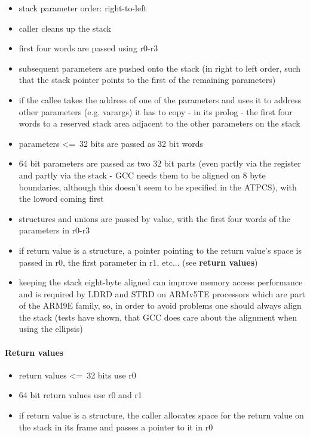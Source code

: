 \begin{itemize}
\item stack parameter order: right-to-left
\item caller cleans up the stack
\item first four words are passed using r0-r3
\item subsequent parameters are pushed onto the stack (in right to left order, such that the stack pointer points to the first of the remaining parameters)
\item if the callee takes the address of one of the parameters and uses it to address other parameters (e.g. varargs) it has to copy - in its prolog - the first four words to a reserved stack area adjacent to the other parameters on the stack
\item parameters \textless=\ 32 bits are passed as 32 bit words
\item 64 bit parameters are passed as two 32 bit parts (even partly via the register and partly via the stack - GCC needs them to be aligned on 8 byte boundaries, although this doesn't seem to be specified in the ATPCS), with the loword coming first
\item structures and unions are passed by value, with the first four words of the parameters in r0-r3
\item if return value is a structure, a pointer pointing to the return value's space is passed in r0, the first parameter in r1, etc... (see {\bf return values})
\item keeping the stack eight-byte aligned can improve memory access performance and is required by LDRD and STRD on ARMv5TE processors which are part of the ARM9E family, so, in order to avoid problems one should always align the stack (tests have shown, that GCC does care about the alignment when using the ellipsis)
\end{itemize}


\paragraph{Return values}
\begin{itemize}
\item return values \textless=\ 32 bits use r0
\item 64 bit return values use r0 and r1
\item if return value is a structure, the caller allocates space for the return value on the stack in its frame and passes a pointer to it in r0
\end{itemize}

